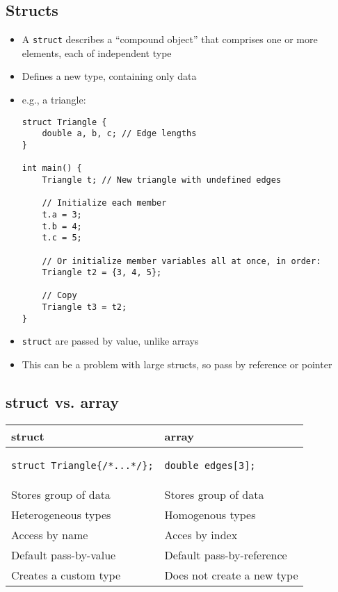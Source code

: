 \subsection{Structs}
\begin{itemize}
	\item A \lstinline[style=C++]{struct} describes a ``compound object'' that comprises one or more elements, each of independent type
	\item Defines a new type, containing only data
	\item e.g., a triangle:
\begin{lstlisting}[style=C++]
struct Triangle {
	double a, b, c; // Edge lengths
}

int main() {
	Triangle t; // New triangle with undefined edges

	// Initialize each member
	t.a = 3;
	t.b = 4;
	t.c = 5;

	// Or initialize member variables all at once, in order:
	Triangle t2 = {3, 4, 5};

	// Copy
	Triangle t3 = t2;
}
\end{lstlisting}
	\item \lstinline[style=C++]{struct} are passed by value, unlike arrays
	\item This can be a problem with large structs, so pass by reference or pointer
\end{itemize}

\subsection{struct vs. array}
\begin{center}
\begin{tabular}[breaklines=true]{p{5cm}|p{5cm}}
	struct & array \\
	\hline
	{\begin{lstlisting}[style=C++]
struct Triangle{/*...*/};
	 	\end{lstlisting}} &
	{\begin{lstlisting}[style=C++]
double edges[3];
	 	\end{lstlisting}} \\
	Stores group of data & Stores group of data \\
	Heterogeneous types & Homogenous types \\
	Access by name & Acces by index \\
	Default pass-by-value & Default pass-by-reference \\
	Creates a custom type & Does not create a new type \\
\end{tabular}
\end{center}

